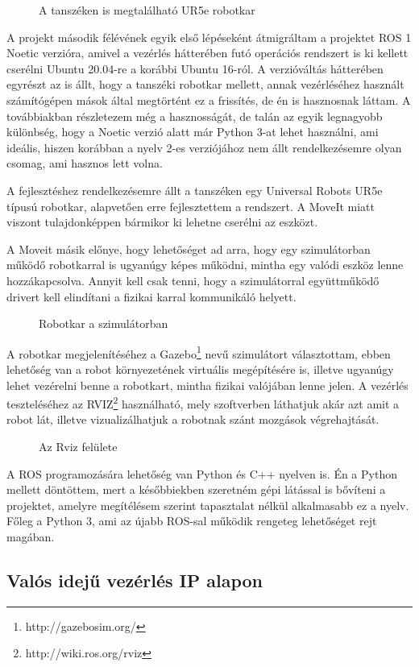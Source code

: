 \documentclass[11pt,a4paper,oneside]{article}
\newcommand{\insertfig}[4]{
	\vspace*{2mm}
	\begin{figure}[#4]
		\center
		\resizebox{#3}{!}{\texttt{[image: images/\#1]}}
		\parbox{0.8\textwidth}{\vspace*{4mm}\caption{{#2}}\small\label{fig:#1}}
	\end{figure}
	\vspace*{-2\parskip}
}
\begin{document}
\insertfig{ur5e}{A tanszéken is megtalálható UR5e robotkar}{6cm}{h!}

A projekt második félévének egyik első lépéseként átmigráltam a projektet ROS 1 Noetic verzióra, amivel a vezérlés hátterében futó operációs rendszert is ki kellett cserélni Ubuntu 20.04-re a korábbi Ubuntu 16-ról. A verzióváltás hátterében egyrészt az is állt, hogy a tanszéki robotkar mellett, annak vezérléséhez használt számítógépen mások által megtörtént ez a frissítés, de én is hasznosnak láttam. A továbbiakban részletezem még a hasznosságát, de talán az egyik legnagyobb különbség, hogy a Noetic verzió alatt már Python 3-at lehet használni, ami ideális, hiszen korábban a nyelv 2-es verziójához nem állt rendelkezésemre olyan csomag, ami hasznos lett volna.



A fejlesztéshez rendelkezésemre állt a tanszéken egy Universal Robots UR5e típusú robotkar, alapvetően erre fejlesztettem a rendszert. A MoveIt miatt viszont tulajdonképpen bármikor ki lehetne cserélni az eszközt.

A Moveit másik előnye, hogy lehetőséget ad arra, hogy egy szimulátorban működő robotkarral is ugyanúgy képes működni, mintha egy valódi eszköz lenne hozzákapcsolva. Annyit kell csak tenni, hogy a szimulátorral együttműködő drivert kell elindítani a fizikai karral kommunikáló helyett.

\insertfig{ur5e_sim}{Robotkar a szimulátorban}{6cm}{h!}

A robotkar megjelenítéséhez a Gazebo\footnote{http://gazebosim.org/} nevű szimulátort választottam, ebben lehetőség van a robot környezetének virtuális megépítésére is, illetve ugyanúgy lehet vezérelni benne a robotkart, mintha fizikai valójában lenne jelen. A vezérlés teszteléséhez az RVIZ\footnote{http://wiki.ros.org/rviz} használható, mely szoftverben láthatjuk akár azt amit a robot lát, illetve vizualizálhatjuk a robotnak szánt mozgások végrehajtását.

\insertfig{rviz}{Az Rviz felülete}{8cm}{h!}

A ROS programozására lehetőség van Python és C++ nyelven is. Én a Python mellett döntöttem, mert a későbbiekben szeretném gépi látással is bővíteni a projektet, amelyre megítélésem szerint tapasztalat nélkül alkalmasabb ez a nyelv. Főleg a Python 3, ami az újabb ROS-sal működik rengeteg lehetőséget rejt magában.

\subsection{Valós idejű vezérlés IP alapon}
\end{document}
